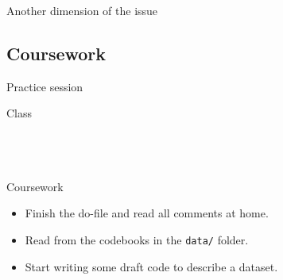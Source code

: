 \documentclass[t]{beamer}
\begin{document}
  \begin{frame}[c, plain]{}
  \end{frame}

  \begin{frame}[c, plain]{}
  \end{frame}

  \begin{frame}[c, plain]{}
  \end{frame}

  \begin{frame}[c, plain]{}
  \end{frame}

  \begin{frame}[c, plain]{}
  \end{frame}

  \begin{frame}[c, plain]{Another dimension of the issue}
  \end{frame}
	
	\subsection{Coursework}
  
	\begin{frame}[t]{Practice session}

    \begin{block}{Class}
      \\
      \\
      
			\\
			\\    
    \end{block}

    \begin{alertblock}{Coursework}
      \begin{itemize}
	       \item Finish the do-file and read all comments at home.
	       \item Read from the codebooks in the \texttt{data/} folder. 
	       \item Start writing some draft code to describe a dataset.
      \end{itemize}
    \end{alertblock}
    		
	\end{frame}
  
\end{document}
